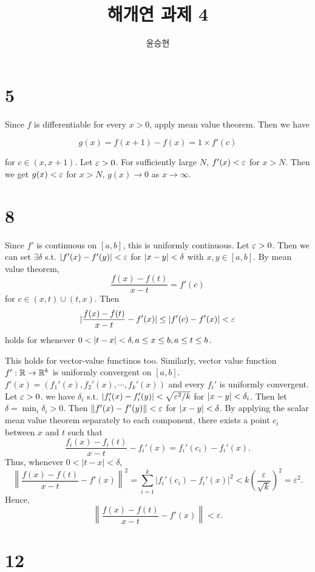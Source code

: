 \documentclass{article}
\title{해개연 과제 4}
\author{윤승현}
\begin{document}
\maketitle

\section*{5}

Since $f$ is differentiable for every $x > 0$, apply mean value theorem. Then we have

\[g(x)=f(x+1)-f(x)=1\times f'(c)\]

for $c \in (x,x+1)$. Let $\varepsilon > 0$. For sufficiently large $N$, $f'(x) < \varepsilon$ for $x > N$. Then we get $g(x) < \varepsilon$ for $x > N$, $g(x) \to 0$ as $x \to \infty$.

\section*{8}

Since $f'$ is continuous on $[a,b]$, this is uniformly continuous. Let $\varepsilon > 0$. Then we can set $\exists \delta$ s.t. $\lvert f'(x)-f'(y)\rvert < \varepsilon$ for $\lvert x-y\rvert < \delta$ with $x,y \in [a,b]$. By mean value theorem, \[\frac{f(x)-f(t)}{x-t} = f'(c)\] for $c \in (x,t) \cup (t,x)$. Then \[\lvert\frac{f(x)-f(t)}{x-t}-f'(x)\rvert \leq \lvert f'(c)-f'(x)\rvert < \varepsilon\] holds for whenever $0 < \lvert t-x\rvert < \delta, a \leq x \leq b, a \leq t \leq b$.


This holds for vector-value functinos too. Similarly, vector value function $f': \mathbb{R} \to \mathbb{R}^k$ is uniformly convergent on $[a,b]$. $f'(x)=(f_1'(x), f_2'(x), \cdots, f_k'(x))$ and every $f_i'$ is uniformly convergent. Let $\varepsilon > 0$. we have $\delta_i$ s.t. $\lvert f_i'(x)-f_i'(y)\rvert < \sqrt{\varepsilon^2/k}$ for $\lvert x-y\rvert < \delta_i$. Then let $\delta = \min_i \delta_i > 0$. Then $\lVert f'(x)-f'(y)\rVert < \varepsilon$ for $\lvert x-y\rvert < \delta$. By applying the scalar mean value theorem separately to each component,
there exists a point $c_i$ between $x$ and $t$ such that
\[
  \frac{f_i(x)-f_i(t)}{x-t}-f_i'(x)
  =f_i'(c_i)-f_i'(x).
\]
Thus, whenever $0<|t-x|<\delta$,
\[
  \left\|\frac{f(x)-f(t)}{x-t}-f'(x)\right\|^2
  =\sum_{i=1}^k |f_i'(c_i)-f_i'(x)|^2
  <k\left(\frac{\varepsilon}{\sqrt{k}}\right)^2
  =\varepsilon^2.
\]
Hence,
\[
  \left\|\frac{f(x)-f(t)}{x-t}-f'(x)\right\|<\varepsilon.
\]


\section*{12}
\end{document}
